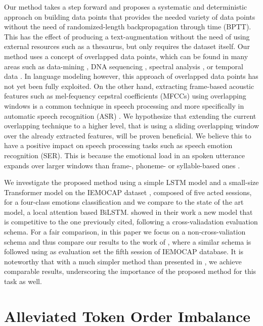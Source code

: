 \documentclass[11pt,a4paper]{article}
\begin{document}
Our method takes a step forward and proposes a systematic and deterministic approach on building data points that provides the needed variety of data points without the need of randomized-length backpropagation through time (BPTT). This has the effect of producing a text-augmentation without the need of using external resources such as a thesaurus, but only requires the dataset itself. Our method uses a concept of overlapped data points, which can be found in many areas such as data-mining \cite{dong:2007sequence}, DNA sequencing \cite{ng2017:dna2vec}, spectral analysis \cite{ding2000:short}, or temporal data \cite{lane1999:temporal}. In language modeling however, this approach of overlapped data points has not yet been fully exploited.
On the other hand, extracting frame-based acoustic features such as mel-fequency cepstral coefficients (MFCCs) using overlapping windows is a common technique in speech processing and more specifically in automatic speech recognition (ASR) \cite{ChiuSOTA, xiong2016achieving, kim2016power}. We hypothesize that extending the current overlapping technique to a higher level, that is using a sliding overlapping window over the already extracted features, will be proven beneficial.
We believe this to have a positive impact on speech processing tasks such as speech emotion recognition (SER). This is because the emotional load in an spoken utterance expands over larger windows than frame-, phoneme- or syllable-based ones \cite{Frijda1986:emotions}. 

We investigate the proposed method using a simple LSTM model and a small-size Transformer model on the IEMOCAP dataset \cite{Busso2008IEMOCAPIE}, composed of five acted sessions, for a four-class emotions classification and we compare to the state of the art \cite{Mirsamadi2017AutomaticSE} model, a local attention based BiLSTM. \citet{Ramet2018ContextAwareAM} showed in their work a new model that is competitive to the one previously cited, following a cross-valiadation evaluation schema. For a fair comparison, in this paper we focus on a non-cross-valiation schema and thus compare our results to the work of \citet{Mirsamadi2017AutomaticSE}, where a similar schema is followed using as evaluation set the fifth session of IEMOCAP database. It is noteworthy that with a much simpler method than presented in  \citet{Ramet2018ContextAwareAM}, we achieve comparable results, underscoring the importance of the proposed method for this task as well.


\section{Alleviated Token Order Imbalance} 
\label{overlapping method}
\end{document}
